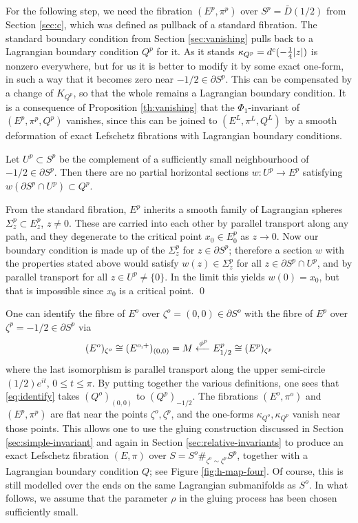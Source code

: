 \documentclass[10pt,letterpaper]{article}
\begin{document}
%
For the following step, we need the fibration $(E^p,\pi^p)$ over $S^p =
\bar{D}(1/2)$ from Section \ref{sec:c}, which was defined as pullback of a
standard fibration. The standard boundary condition from Section
\ref{sec:vanishing} pulls back to a Lagrangian boundary condition $Q^p$ for it.
As it stands $\kappa_{Q^p} = d^c(-{\textstyle\frac{1}{4}}|z|)$ is nonzero everywhere, but for
us it is better to modify it by some exact one-form, in such a way that it
becomes zero near $-1/2 \in \partial S^p$. This can be compensated by a change
of $K_{Q^p}$, so that the whole remains a Lagrangian boundary condition. It is
a consequence of Proposition \ref{th:vanishing} that the $\Phi_1$-invariant of
$(E^p,\pi^p,Q^p)$ vanishes, since this can be joined to $(E^L,\pi^L,Q^L)$ by a
smooth deformation of exact Lefschetz fibrations with Lagrangian boundary
conditions.

\begin{lemma} \label{th:p-sections}
Let $U^p \subset S^p$ be the complement of a sufficiently small neighbourhood
of $-1/2 \in \partial S^p$. Then there are no partial horizontal sections $w:
U^p \rightarrow E^p$ satisfying $w(\partial S^p \cap U^p) \subset Q^p$.
\end{lemma}

\proof From the standard fibration, $E^p$ inherits a smooth family of
Lagrangian spheres $\Sigma^p_z \subset E^p_z$, $z \neq 0$. These are carried
into each other by parallel transport along any path, and they degenerate to
the critical point $x_0 \in E^p_0$ as $z \rightarrow 0$. Now our boundary
condition is made up of the $\Sigma^p_z$ for $z \in \partial S^p$; therefore a
section $w$ with the properties stated above would satisfy $w(z) \in
\Sigma^p_z$ for all $z \in \partial S^p \cap U^p$, and by parallel transport
for all $z \in U^p \neq \{0\}$. In the limit this yields $w(0) = x_0$, but that
is impossible since $x_0$ is a critical point. \qed

One can identify the fibre of $E^o$ over $\zeta^o = (0,0) \in \partial S^o$
with the fibre of $E^p$ over $\zeta^p = -1/2 \in \partial S^p$ via
\begin{equation} \label{eq:identify}
(E^o)_{\zeta^o} \cong (E^{o,+})_{(0,0)} = M \xleftarrow{\phi^p} E^p_{1/2} \cong
(E^p)_{\zeta^p}
\end{equation}
where the last isomorphism is parallel transport along the upper semi-circle
$(1/2)e^{it}$, $0 \leq t \leq \pi$. By putting together the various
definitions, one sees that \eqref{eq:identify} takes $(Q^o)_{(0,0)}$ to
$(Q^p)_{-1/2}$. The fibrations $(E^o,\pi^o)$ and $(E^p,\pi^p)$ are flat near
the points $\zeta^o,\zeta^p$, and the one-forms $\kappa_{Q^o},\kappa_{Q^p}$
vanish near those points. This allows one to use the gluing construction
discussed in Section \ref{sec:simple-invariant} and again in Section
\ref{sec:relative-invariants} to produce an exact Lefschetz fibration $(E,\pi)$
over $S = S^o \#_{\zeta^o \sim \zeta^p} S^p$, together with a Lagrangian
boundary condition $Q$; see Figure \ref{fig:h-map-four}. Of course, this is
still modelled over the ends on the same Lagrangian submanifolds as $S^o$. In
what follows, we assume that the parameter $\rho$ in the gluing process has
been chosen sufficiently small.
\end{document}
